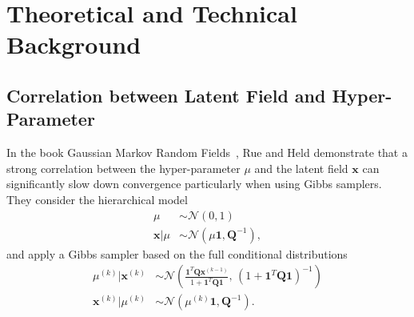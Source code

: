 \chapter{Theoretical and Technical Background}


\section{Correlation between Latent Field and Hyper-Parameter}
\label{ap:Correlation}
In the book Gaussian Markov Random Fields~\cite{rue2005gaussian}, Rue and Held demonstrate that a strong correlation between the hyper-parameter $\mu$ and the latent field $\bm{x}$ can significantly slow down convergence particularly when using Gibbs samplers.  
They consider the hierarchical model
\begin{subequations}
	\label{eq:rueMod}
	\begin{align}
		\mu &\sim \mathcal{N}(0, 1) \\
		\bm{x} | \mu &\sim \mathcal{N}(\mu \bm{1}, \bm{Q}^{-1}),
	\end{align}
\end{subequations}
and apply a Gibbs sampler based on the full conditional distributions
\begin{align}
	\mu^{(k)} | \bm{x}^{(k)} &\sim \mathcal{N} \left( \frac{\bm{1}^T \bm{Q} \bm{x}^{(k-1)}}{1 + \bm{1}^T \bm{Q} \bm{1}}, \, \left(1 + \bm{1}^T \bm{Q} \bm{1} \right)^{-1} \right) \label{eq:gibbsMu} \\
	\bm{x}^{(k)} | \mu^{(k)} &\sim \mathcal{N}(\mu^{(k)} \bm{1}, \bm{Q}^{-1})\label{eq:gibbsx}.
\end{align}

